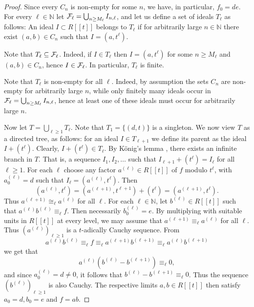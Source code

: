 \documentclass{article}
\newcommand{\N}{\mathbb{N}}
\theoremstyle{plain}
\theoremstyle{definition}
\theoremstyle{remark}
\theoremstyle{plain}
\begin{document}
\begin{proof}
    Since every $C_n$ is non-empty for some $n$, we have, in particular, $f_0 = de$. For every $\ell \in \N$ let ${\cal{F}}_\ell = \bigcup_{n \geq M_\ell} I_{n,\ell}$, and let us define a set of ideals $T_\ell$ as follows: An ideal $I \subset R[[t]]$ belongs to $T_\ell$ if for arbitrarily large $n \in \N$ there exist $(a,b) \in C_n$ such that $I = (a,t^\ell)$. 
    
    Note that $T_\ell \subseteq {\cal{F}}_\ell$. Indeed, if $I \in T_\ell$ then $I = (a,t^\ell)$ for some $n \geq M_\ell$ and $(a,b) \in C_n$, hence $I \in {\cal{F}}_\ell$. In particular, $T_\ell$ is finite. 

    Note that $T_\ell$ is non-empty for all $\ell$. Indeed, by assumption the sets $C_n$ are non-empty for arbitrarily large $n$, while only finitely many ideals occur in ${\cal{F}}_\ell = \bigcup_{n \geq M_\ell} I_{n,\ell}$, hence at least one of these ideals must occur for arbitrarily large $n$. 

    Now let $T = \bigcup_{\ell \geq 1}T_\ell$. Note that $T_1 =\{ (d,t)\}$ is a singleton. We now view $T$ as a directed tree, as follows: for an ideal $I \in T_{\ell+1}$ we define its parent as the ideal $I+(t^\ell)$. Clearly, $I+(t^\ell) \in T_\ell$. By K{\"o}nig's lemma \cite{Konig27}, there exists an infinite branch in $T$. That is, a sequence $I_1,I_2,\ldots$ such that $I_{\ell+1}+(t^\ell) = I_\ell$ for all $\ell \geq 1$. For each $\ell$ choose any factor $a^{(\ell)} \in R[[t]]$ of $f$ modulo $t^\ell$, with $a^{(\ell)}_0 = d$ such that $I_\ell = (a^{(\ell)},t^\ell)$. Then $$(a^{(\ell)},t^\ell) = (a^{(\ell+1)},t^{\ell+1})+(t^\ell) =(a^{(\ell+1)},t^{\ell}).$$  Thus $a^{(\ell+1)} \cong_\ell a^{(\ell)}$ for all $\ell$. For each $\ell \in \N$, let $b^{(\ell)} \in R[[t]]$ such that $a^{(\ell)}b^{(\ell)} \equiv_\ell f$. Then necessarily $b^{(\ell)}_0 = e$. By multiplying with suitable units in $R[[t]]$ at every level, we may assume that $a^{(\ell+1)} \equiv_\ell a^{(\ell)}$ for all $\ell$. Thus $(a^{(\ell)})_{\ell \geq 1}$ is a $t$-adically Cauchy sequence. From
    $$a^{(\ell)}b^{(\ell)} \equiv_\ell f \equiv_\ell a^{(\ell+1)}b^{(\ell+1)} \equiv_\ell a^{(\ell)}b^{(\ell+1)}$$ we get that $$a^{(\ell)}(b^{(\ell)}-b^{(\ell+1)}) \equiv_\ell 0,$$
and since $a^{(\ell)}_0= d \neq 0$, it follows that $b^{(\ell)}-b^{(\ell+1)} \equiv_\ell 0$. Thus the sequence $(b^{(\ell)})_{\ell \geq 1}$ is also Cauchy.  The respective limits $a,b \in R[[t]]$ then satisfy $a_0 = d, b_0 = e$ and $f = ab$.\end{proof}
\end{document}
